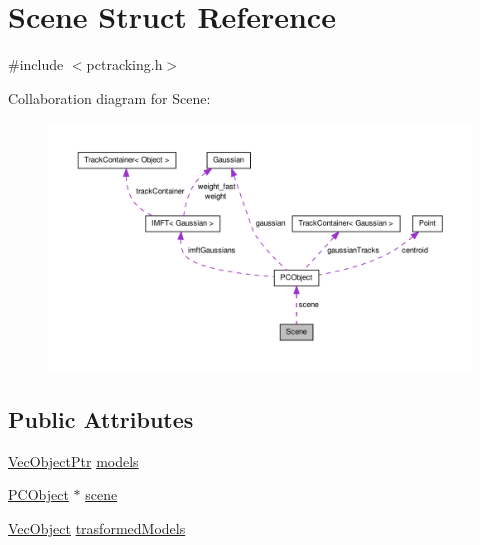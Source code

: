\hypertarget{struct_scene}{\section{\-Scene \-Struct \-Reference}
\label{struct_scene}
}


{\ttfamily \#include $<$pctracking.\-h$>$}



\-Collaboration diagram for \-Scene\-:
\nopagebreak
\begin{figure}[H]
\begin{center}
\leavevmode
\includegraphics[width=350pt]{struct_scene__coll__graph}
\end{center}
\end{figure}
\subsection*{\-Public \-Attributes}
\begin{DoxyCompactItemize}
\item 
\hyperlink{pctracking_8h_acb57bb1f15b5379bb7d839496fbcc30f}{\-Vec\-Object\-Ptr} \hyperlink{struct_scene_a0483d18d0b67d7655df8d7cb338606de}{models}
\item 
\hyperlink{class_p_c_object}{\-P\-C\-Object} $\ast$ \hyperlink{struct_scene_ac57f5d6c6d10c2fa5ff08b7f3834dc26}{scene}
\item 
\hyperlink{pctracking_8h_a67df89defefa5da6be86d3703f5a20f3}{\-Vec\-Object} \hyperlink{struct_scene_a4c6f65a07e6a8ffe5d99fa6a6eff846a}{trasformed\-Models}
\end{DoxyCompactItemize}


